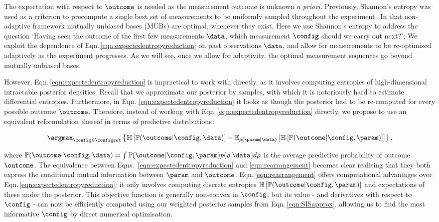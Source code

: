 The expectation with respect to $\outcome$ is needed as the measurement outcome is unknown \emph{a priori}. 
Previously, Shannon's entropy was used as a criterion to precompute a single best set of measurements to be uniformly sampled throughout the experiment\,\cite{MUBFirst,ExactInformation}. In that non-adaptive framework mutually unbiased bases (MUBs) are optimal, whenever they exist. Here we use Shannon's entropy to address the question `Having seen the outcome of the first few measurements $\data$, which measurement $\config$ should we carry out next?'; We exploit the dependence of Eqn.\,\eqref{eqn:expectedentropyreduction} on past observations $\data$, and allow for measurements to be re-optimised adaptively as the experiment progresses. As we will see, once we allow for adaptivity, the optimal measurement sequences go beyond mutually unbiased bases.

However, Eqn.\,\eqref{eqn:expectedentropyreduction}  is impractical to work with directly, as it involves computing entropies of high-dimensional intractable posterior densities. Recall that we approximate our posterior by samples, with which it is notoriously hard to estimate differential entropies. Furthermore, in Eqn. \eqref{eqn:expectedentropyreduction}  it looks as though the posterior had to be re-computed for every possible outcome $\outcome$. Therefore, instead of working with Eqn.\,\eqref{eqn:expectedentropyreduction} directly, we propose to use an equivalent reformulation thereof in terms of predictive distributions\,\cite{ExactInformation}:

\begin{equation}
\argmax_{\config\in\configset} \left\{ \mathbb{H}\left[\mathbb{P}(\outcome|\config,\data)\right] - \mathbb{E}_{p(\param\vert\data)}\left[\mathbb{H}\left[ \mathbb{P}(\outcome|\config,\param) \right] \right]\right\}\label{eqn:rearrangement},
\end{equation}

where $\mathbb{P}(\outcome|\config,\data) = \int \mathbb{P}(\outcome|\config,\param) p(\rho\vert \data) d\rho$ is the average predictive probability of outcome $\outcome$. The equivalence between Eqns.\, \eqref{eqn:expectedentropyreduction} and \eqref{eqn:rearrangement} becomes clear realising that they both express the conditional mutual information between $\param$ and $\outcome$. Eqn.\,\eqref{eqn:rearrangement} offers computational advantages over Eqn.\,\eqref{eqn:expectedentropyreduction}: it only involves computing discrete entropies $\mathbb{H}\left[ \mathbb{P}(\outcome|\config,\param) \right]$ and expectations of these under the posterior. This objective function is generally non-convex in $\config$, but its value - and derivatives with respect to $\config$ - can now be efficiently computed using our weighted posterior samples from Eqn.\,\eqref{eqn:SISapprox}, allowing us to find the most informative $\config$ by direct numerical optimisation.

